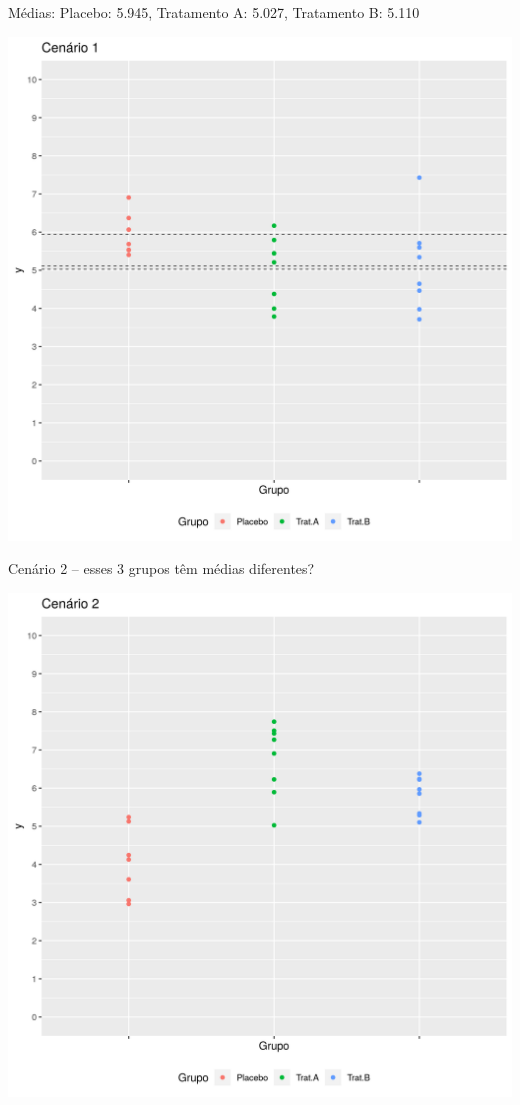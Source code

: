 \documentclass{beamer}
\begin{document}
\begin{frame}{\footnotesize Médias: Placebo: 5.945, Tratamento A: 5.027, Tratamento B: 5.110}
  \begin{center}
    \includegraphics[height=.9\textheight]{Cap13-30/cenario1_medias}

  \end{center}
\end{frame}

\begin{frame}[label=cenario2]{\small Cenário 2 -- esses 3 grupos têm médias diferentes?}
  \begin{center}
    \includegraphics[height=.9\textheight]{Cap13-30/cenario2}
  \end{center}
\end{frame}
\end{document}

